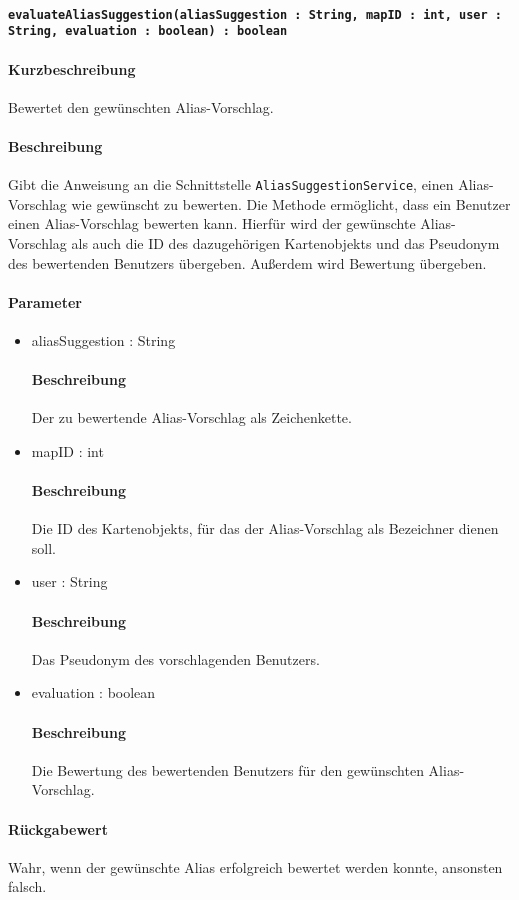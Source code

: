 \paragraph{\texttt{evaluateAliasSuggestion(aliasSuggestion : String, mapID : int, user : String, evaluation : boolean) : boolean}}%
\paragraph*{Kurzbeschreibung}
Bewertet den gewünschten Alias-Vorschlag.
\paragraph*{Beschreibung}
Gibt die Anweisung an die Schnittstelle \texttt{AliasSuggestionService}, einen Alias-Vorschlag wie gewünscht zu bewerten.
Die Methode ermöglicht, dass ein Benutzer einen Alias-Vorschlag bewerten kann. 
Hierfür wird der gewünschte Alias-Vorschlag als auch die ID des dazugehörigen Kartenobjekts und das Pseudonym des bewertenden Benutzers übergeben.
Außerdem wird Bewertung übergeben.
\paragraph*{Parameter}
\begin{itemize}
	\item aliasSuggestion : String
		\paragraph*{Beschreibung}
		Der zu bewertende Alias-Vorschlag als Zeichenkette.
	\item mapID : int
		\paragraph*{Beschreibung}
		Die ID des Kartenobjekts, für das der Alias-Vorschlag als Bezeichner dienen soll.
	\item user : String
		\paragraph*{Beschreibung}
		Das Pseudonym des vorschlagenden Benutzers.
	\item evaluation : boolean
		\paragraph*{Beschreibung}
		Die Bewertung des bewertenden Benutzers für den gewünschten Alias-Vorschlag.
\end{itemize}
\paragraph*{Rückgabewert}
Wahr, wenn der gewünschte Alias erfolgreich bewertet werden konnte, ansonsten falsch.
